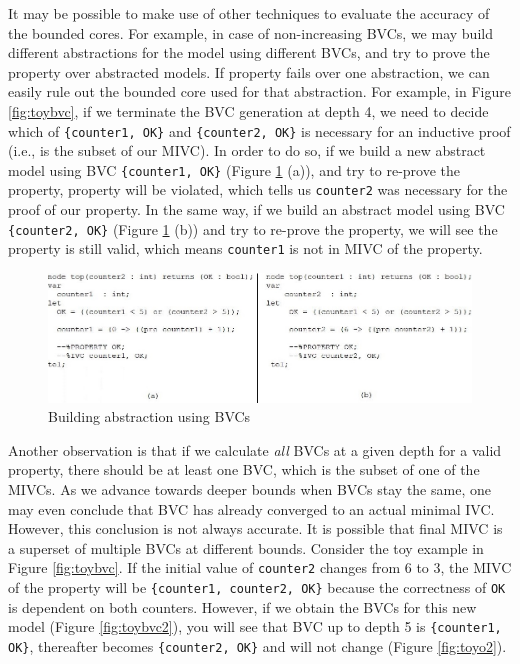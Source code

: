 It may be possible to make use of other techniques to evaluate the accuracy of the bounded cores. For example, in case of non-increasing BVCs, we may build different abstractions for the model using different BVCs, and try to prove the property over abstracted models. If property fails over one abstraction, we can easily rule out the bounded core used for that abstraction. For example, in Figure \ref{fig:toybvc}, if we terminate the BVC generation at depth 4, we need to decide which of {\small{\texttt{\{counter1, OK\}}}} and {\small{\texttt{\{counter2, OK\}}}} is necessary for an inductive proof (i.e., is the subset of our MIVC). In order to do so, if we build a new abstract model using BVC {\small{\texttt{\{counter1, OK\}}}} (Figure \ref{fig:absbvc} (a)), and try to re-prove the property, property will be violated, which tells us   {\small{\texttt{counter2}}} was necessary for the proof of our property. In the same way, if we build an abstract model using BVC  {\small{\texttt{\{counter2, OK\}}}} (Figure \ref{fig:absbvc} (b)) and try to re-prove the property, we will see the property is still valid, which means  {\small{\texttt{counter1}}} is not in MIVC of the property.

  \begin{figure}
 \centering
  \includegraphics[width=\textwidth]{figs/absbvc.jpg}
  \caption{Building abstraction using BVCs}
  \vspace{0.1in}
  \label{fig:absbvc}
  \vspace{0.1in}
\end{figure}


Another observation is that if we calculate \emph{all} BVCs at a given depth for a valid property, there should be at least one BVC, which is the subset of one of the MIVCs. As we advance towards deeper bounds when BVCs stay the same, one may even conclude that BVC has already converged to an actual minimal IVC. However, this conclusion is not always accurate. It is possible that final MIVC is a superset of multiple BVCs at different bounds. Consider the toy example in Figure \ref{fig:toybvc}. If the initial value of {\small{\texttt{counter2}}} changes from 6 to 3, the MIVC of the property will be {\small{\texttt{\{counter1, counter2, OK\}}}} because the correctness of {\small{\texttt{OK}}} is dependent on both counters. However, if we obtain the BVCs for this new model (Figure \ref{fig:toybvc2}), you will see that BVC up to depth 5 is  {\small{\texttt{\{counter1, OK\}}}}, thereafter becomes {\small{\texttt{\{counter2, OK\}}}} and will not change (Figure \ref{fig:toyo2}).

